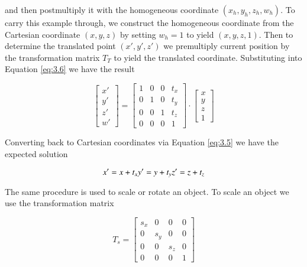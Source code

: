 and then postmultiply it with the homogeneous coordinate $(x_h, y_h, z_h, w_h)$. To carry this example through, we construct the homogeneous coordinate from the Cartesian coordinate $( x, y, z)$ by setting $w_h = 1$ to yield $(x, y, z, 1)$. Then to determine the translated point $(x' , y', z')$ we premultiply current position by the transformation matrix $T_T$ to yield the translated coordinate. Substituting into Equation \ref{eq:3.6} we have the result

\begin{equation}\label{eq:3.7}
\left[\begin{array}{c}
x'      \\
y'       \\
z'      \\
w'
\end{array}\right] =\left[\begin{array}{cccc}
1 & 0 & 0 & t_x       \\
0 & 1 & 0 & t_y       \\
0 & 0 & 1 & t_z      \\
0 & 0 & 0 & 1
\end{array}\right] \cdot
\left[\begin{array}{c}
x      \\
y       \\
z      \\
1
\end{array}\right] 
\end{equation}

Converting back to Cartesian coordinates via Equation \ref{eq:3.5} we have the expected solution

\begin{equation}\label{eq:3.8}
x' = x +t_x \\
y' = y + t_y \\
z' = z + t_z
\end{equation}

The same procedure is used to scale or rotate an object. To scale an object we use the transformation matrix

\begin{equation}\label{eq:3.9}
T_s = \left[\begin{array}{cccc}
s_x & 0 & 0 & 0 \\
0 & s_y & 0 & 0 \\
0 & 0 & s_z & 0 \\
0 & 0 & 0 & 1
\end{array}\right]
\end{equation}


